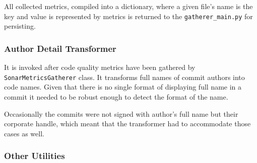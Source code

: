 All collected metrics, compiled into a dictionary, where a given file's name is the key and value is represented by metrics is returned to the \texttt{gatherer\_main.py} for persisting.

\subsubsection{Author Detail Transformer}\label{sec:source-code:author-encoder}
It is invoked after code quality metrics have been gathered by \texttt{SonarMetricsGatherer} class. It transforms full names of commit authors into code names. Given that there is no single format of displaying full name in a commit it needed to be robust enough to detect the format of the name. 

Occasionally the commits were not signed with author's full name but their corporate handle, which meant that the transformer had to accommodate those cases as well.

\subsubsection{Other Utilities}


